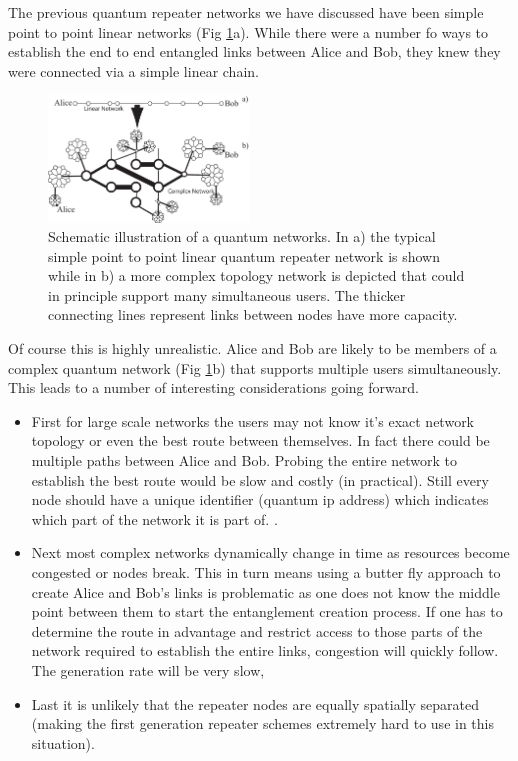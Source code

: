 \documentclass[twocolumn, aps, rmp, amsmath, amssymb, nofootinbib, superscriptaddress, longbibliography, floatfix, table-of-contents, eqsecnum]{revtex4-1}
\begin{document}
The previous quantum repeater networks we have discussed have been simple point to point linear networks (Fig \ref{fig10}a). While there were a number fo ways to establish the end to end entangled links between Alice and Bob, they knew they were connected via a simple linear chain. 
\begin{figure}[!htb]
\begin{center}
\includegraphics[width=0.475\textwidth]{repeaters_10}
\end{center}
\caption{Schematic illustration of a quantum networks. In a) the typical simple point to point linear quantum repeater network is shown while in b) a more complex topology network  is depicted that could in principle support many simultaneous users. The thicker connecting lines represent links between nodes have more capacity.}
\label{fig10}
\end{figure} 
Of course this is highly unrealistic. Alice and Bob are likely to be members of a complex quantum network (Fig \ref{fig10}b) that supports multiple users  simultaneously. This leads to a number of interesting considerations going forward. 
\begin{itemize}
\item First for large scale networks the users may not know it's exact network topology or even the best route between themselves. In fact there could be multiple paths between Alice and Bob. Probing the entire network to establish the best route would be slow and costly (in practical). Still every node should have a unique identifier (quantum ip address) which indicates which part of the network it is part of. .
\item Next most complex networks dynamically change in time as resources become congested or nodes break. This in turn means using a butter fly approach to create Alice and Bob's links is problematic as one does not know the middle point between them to start the entanglement creation process. If one has to determine the route in advantage and restrict access to those parts of the network required to establish the entire links, congestion will quickly follow. The generation rate will be very slow, 
\item Last it is unlikely that the repeater nodes are equally spatially separated (making the first generation repeater schemes extremely hard to use in this situation). 
\end{itemize}
\end{document}
